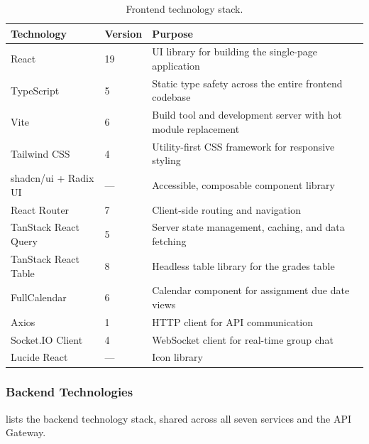\begin{table}[H]
  \centering
  \caption{Frontend technology stack.}
  \label{tab:frontend-stack}
  \small
  \begin{tabularx}{\textwidth}{@{} l l X @{}}
    \toprule
    \textbf{Technology} & \textbf{Version} & \textbf{Purpose} \\
    \midrule
    React                & 19        & UI library for building the single-page application \\
    TypeScript           & 5         & Static type safety across the entire frontend codebase \\
    Vite                 & 6         & Build tool and development server with hot module replacement \\
    Tailwind CSS         & 4         & Utility-first CSS framework for responsive styling \\
    shadcn/ui + Radix UI & ---       & Accessible, composable component library \\
    React Router         & 7         & Client-side routing and navigation \\
    TanStack React Query & 5         & Server state management, caching, and data fetching \\
    TanStack React Table & 8         & Headless table library for the grades table \\
    FullCalendar         & 6         & Calendar component for assignment due date views \\
    Axios                & 1         & HTTP client for API communication \\
    Socket.IO Client     & 4         & WebSocket client for real-time group chat \\
    Lucide React         & ---       & Icon library \\
    \bottomrule
  \end{tabularx}
\end{table}

\subsubsection{Backend Technologies}

 lists the backend technology stack, shared across all seven services and the API Gateway.

